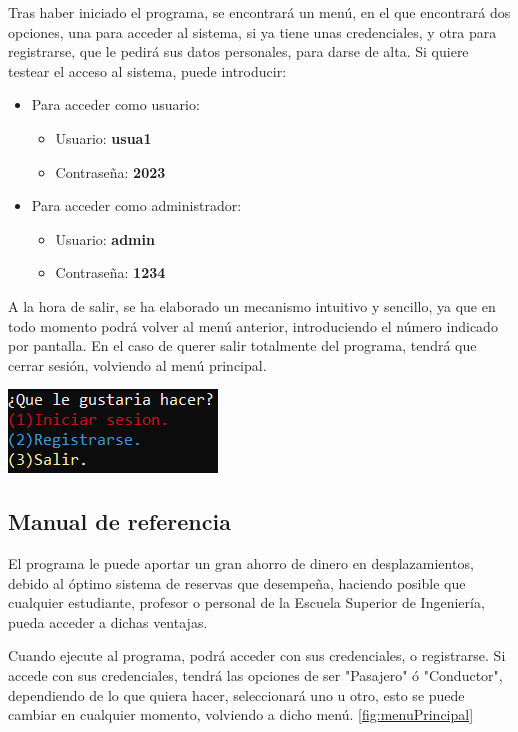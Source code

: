 Tras haber iniciado el programa, se encontrará un menú, en el que encontrará dos opciones, una para acceder al sistema, si ya tiene unas credenciales, y otra para registrarse,
que le pedirá sus datos personales, para darse de alta. Si quiere testear el acceso al sistema, puede introducir:
\begin{itemize}
  \item Para acceder como usuario:
  \begin{itemize}
    \item Usuario: \textbf{usua1}
    \item Contraseña: \textbf{2023}
  \end{itemize}
  \item Para acceder como administrador:
  \begin{itemize}
    \item Usuario: \textbf{admin}
    \item Contraseña: \textbf{1234}
  \end{itemize}
\end{itemize}

A la hora de salir, se ha elaborado un mecanismo intuitivo y sencillo, ya que en todo momento podrá volver al menú anterior, introduciendo el número indicado por pantalla.
En el caso de querer salir totalmente del programa, tendrá que cerrar sesión, volviendo al menú principal.
\begin{center}
\includegraphics[]{FOTOS/menuPrincipal.png}
\label{fig:menuPrincipal}
\end{center}

\subsection{Manual de referencia}

El programa le puede aportar un gran ahorro de dinero en desplazamientos, debido al óptimo sistema de reservas que desempeña, haciendo posible que cualquier estudiante, profesor o personal
de la Escuela Superior de Ingeniería, pueda acceder a dichas ventajas.

\bigskip

Cuando ejecute al programa, podrá acceder con sus credenciales, o registrarse. Si accede con sus credenciales, tendrá las opciones de ser "Pasajero" ó "Conductor", 
dependiendo de lo que quiera hacer, seleccionará uno u otro, esto se puede cambiar en cualquier momento, volviendo a dicho menú. \ref{fig:menuPrincipal}

